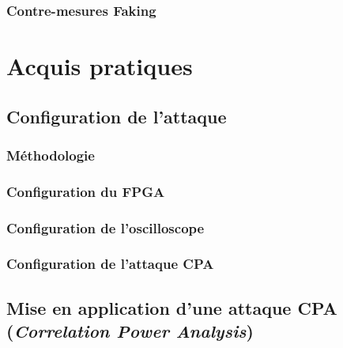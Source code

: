 \documentclass[oneside]{book}
\begin{document}
\section{Contre-mesures Faking}
\label{sec:Introduction}

\newpage



\part{Acquis pratiques}


\chapter{Configuration de l'attaque}

\section{Méthodologie}
\label{sec:Introduction}

\section{Configuration du FPGA}
\label{sec:Introduction}

\section{Configuration de l'oscilloscope}
\label{sec:Introduction}

\section{Configuration de l'attaque CPA}
\label{sec:Introduction}

\newpage


\chapter{Mise en application d'une attaque CPA (\textit{Correlation Power Analysis})}
\end{document}
